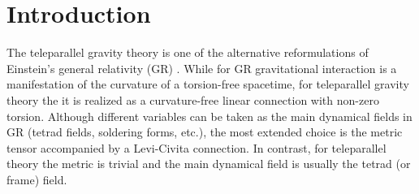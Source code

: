 \documentclass[
10pt, %
a4paper, %
oneside, %
headinclude,footinclude, %
BCOR5mm, %
]{scrartcl}
\newcommand{\ho}[1]{\textcolor{magenta}{HO: #1}}
\begin{document}
\setlength\parindent{10pt} %
\setlength{\parskip}{5pt} %


\section{Introduction}

The teleparallel gravity theory is one of the alternative reformulations of Einstein's 
general relativity (GR) \cite{Hehl1976,AldrovandiPereiraBook,Cai2016}. While for GR
gravitational interaction is a manifestation of the curvature of a torsion-free
spacetime,
for teleparallel gravity theory the it is realized as a curvature-free linear connection
with non-zero torsion.
Although different variables can be taken as the main dynamical fields in GR
(tetrad fields, soldering forms, etc.),
the most extended choice is the metric tensor accompanied by a Levi-Civita connection.
In contrast, for teleparallel theory the metric is trivial and the main dynamical field
is usually the tetrad (or frame) field.
\end{document}
